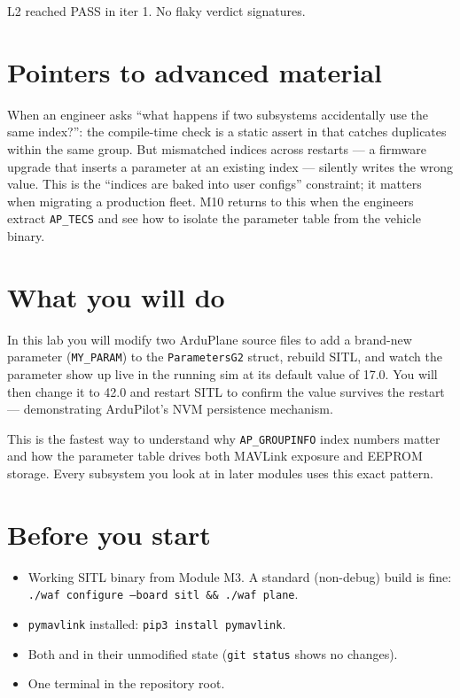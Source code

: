 \documentclass[a4paper,11pt,twoside]{article}
\renewcommand{\insttiming}[1]{\ifinstructor\begin{tcolorbox}[colback=orange!5!white,colframe=orange!50!black,title=Pacing,breakable]#1\end{tcolorbox}\fi}
\renewcommand{\instadvanced}[1]{\ifinstructor\begin{tcolorbox}[colback=violet!5!white,colframe=violet!50!black,title=Advanced material pointer,breakable]#1\end{tcolorbox}\fi}
\begin{document}
\insttiming{L2 reached PASS in iter 1. No flaky verdict signatures.}

\section*{Pointers to advanced material}

\instadvanced{When an engineer asks ``what happens if two subsystems accidentally use the same index?'': the compile-time check is a static assert in \citefile{libraries/AP\_Param/AP\_Param.cpp} that catches duplicates within the same group. But mismatched indices across restarts --- a firmware upgrade that inserts a parameter at an existing index --- silently writes the wrong value. This is the ``indices are baked into user configs'' constraint; it matters when migrating a production fleet. M10 returns to this when the engineers extract \texttt{AP\_TECS} and see how to isolate the parameter table from the vehicle binary.}

\else

\section*{What you will do}

In this lab you will modify two ArduPlane source files to add a brand-new parameter (\texttt{MY\_PARAM}) to the \texttt{ParametersG2} struct, rebuild SITL, and watch the parameter show up live in the running sim at its default value of 17.0. You will then change it to 42.0 and restart SITL to confirm the value survives the restart --- demonstrating ArduPilot's NVM persistence mechanism.

This is the fastest way to understand why \texttt{AP\_GROUPINFO} index numbers matter and how the parameter table drives both MAVLink exposure and EEPROM storage. Every subsystem you look at in later modules uses this exact pattern.

\section*{Before you start}

\begin{itemize}
  \item Working SITL binary from Module M3. A standard (non-debug) build is fine: \texttt{./waf configure --board sitl \&\& ./waf plane}.
  \item \texttt{pymavlink} installed: \texttt{pip3 install pymavlink}.
  \item Both  and  in their unmodified state (\texttt{git status} shows no changes).
  \item One terminal in the repository root.
\end{itemize}
\end{document}
